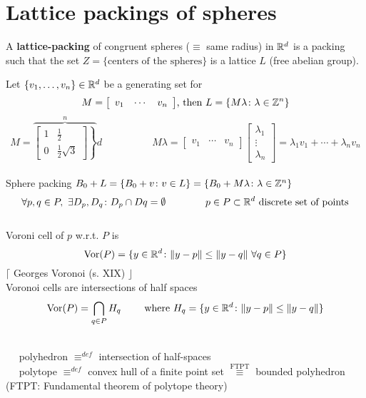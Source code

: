 \section{Lattice packings of spheres}

A {\textbf{lattice-packing}} of congruent spheres ($\equiv$ same radius) in $\mathbb{R}^{d}$ is a packing such that the set $Z=\{\mbox{centers of the spheres}\}$ is a lattice $L$ (free abelian group).

Let $\{v_1, \ldots, v_n\}\in\mathbb{R}^{d}$ be a generating set for $$M=\left[\begin{array}{ccc}v_1 & \cdots & v_n\end{array}\right]\!\mbox{, then }L=\{M\lambda\colon\lambda\in\mathbb{Z}^{n}\}$$
$$M=\overbrace{\left.\left[\begin{array}{cc}1 & \frac{1}{2} \\ 0 & \frac{1}{2}\sqrt{3} \end{array}\!\right]\right\}}^{n}\!d\quad\quad\quad\quad\quad{}M\lambda=\left[\begin{array}{ccc}v_1 & \cdots & v_n\end{array}\right]\!\left[\begin{array}{c}\lambda_1 \\ \vdots \\ \lambda_n \end{array}\right]=\lambda_1{}v_1+\cdots+\lambda_n{}v_n$$\\[0.2cm]

Sphere packing $B_0+L=\{B_0+v\colon{}v\in{}L\}=\{B_0+M\lambda\colon\lambda\in\mathbb{Z}^{n}\}$
$$\forall{}p,q\in{}P,\mbox{ }\exists{}D_p, D_q\colon{}D_p\cap{}Dq=\emptyset\quad\quad\quad\quad{}p\in{}P\subset\mathbb{R}^{d}\mbox{ discrete set of points}$$\\[0.1cm]
Voroni cell of $p$ w.r.t. $P$ is$$\mbox{Vor}(P)=\{y\in\mathbb{R}^{d}\colon\lVert{}y-p\rVert\leq\lVert{}y-q\rVert\mbox{ }\forall{}q\in{}P\}$$
$\lceil$ Georges Voronoi (s. XIX) $\rfloor$\\[0.3cm]
Voronoi cells are intersections of half spaces$$\mbox{Vor}(P)=\bigcap_{q\in{}P}H_q\quad\quad\mbox{ where }H_q=\{y\in\mathbb{R}^{d}\colon\lVert{}y-p\rVert\leq\lVert{}y-q\rVert\}$$

\begin{defn}\mbox{ }\\
$\mbox{    }\mbox{    } $polyhedron $\equiv^{def}$ intersection of half-spaces\\
$\mbox{    }\mbox{    } $polytope $\equiv^{def}$ convex hull of a finite point set $\overset{\text{FTPT}}{\equiv}$ bounded polyhedron\\[0.1cm]
{\small \upshape (FTPT: Fundamental theorem of polytope theory)}
\end{defn}\mbox{ }

